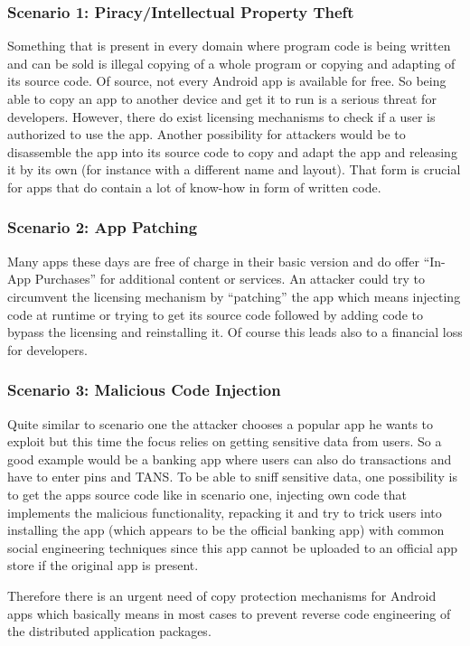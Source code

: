 \subsubsection*{Scenario 1: Piracy/Intellectual Property Theft}
Something that is present in every domain where program code is being written
and can be sold is illegal copying of a whole program or copying and adapting of
its source code. Of source, not every Android app is available for free. So being
able to copy an app to another device and get it to run is a serious threat for developers. However, there do exist licensing mechanisms to check if a user is 
authorized to use the app. Another possibility for attackers would be to disassemble
the app into its source code to copy and adapt the app and releasing it by its own
(for instance with a different name and layout).
That form is crucial for apps that do contain a lot of know-how in form of written code.



\subsubsection*{Scenario 2: App Patching}
Many apps these days are free of charge in their basic version and
do offer ``In-App Purchases'' for additional content or services.
An attacker could try to circumvent the licensing mechanism 
by ``patching'' the app which means injecting code at runtime or trying to get its source
code followed by adding code to bypass the licensing and reinstalling it. Of course this
leads also to a financial loss for developers. 

\subsubsection*{Scenario 3: Malicious Code Injection}
Quite similar to scenario one the attacker chooses a popular app he wants to exploit 
but this time the focus relies on getting sensitive data from users. So a good example
would be a banking app where users can also do transactions and have to enter pins and TANS. To be able to sniff sensitive data, one possibility is to get the apps source code
like in scenario one, injecting own code that implements the malicious functionality, repacking it and try to trick users into installing the app (which appears to be the
official banking app) with common social engineering techniques since this app cannot be
uploaded to an official app store if the original app is present. 



Therefore there is an urgent need of copy protection mechanisms
for Android apps which basically means in most cases to prevent reverse code engineering of the distributed application packages. 
